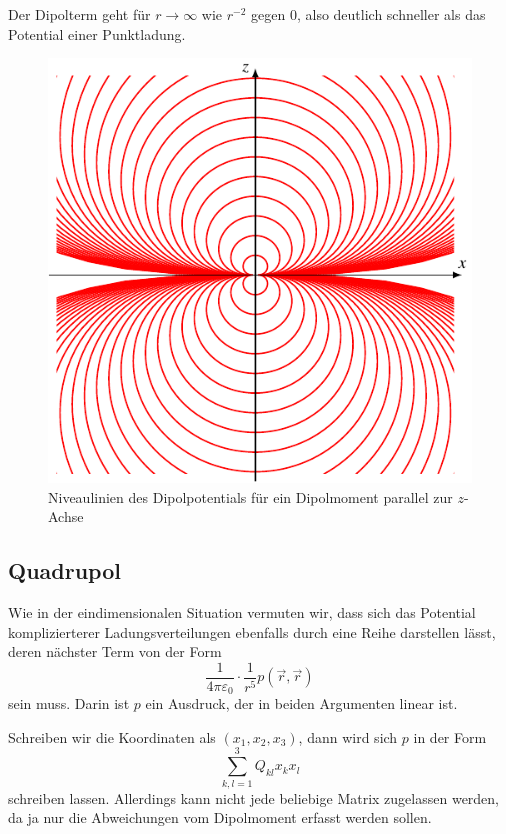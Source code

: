 Der Dipolterm geht für $r\to\infty$ wie $r^{-2}$ gegen $0$, also
deutlich schneller als das Potential einer Punktladung.

\begin{figure}
\centering
\includegraphics{chapters/tikz/dipol3.pdf}
\caption{Niveaulinien des Dipolpotentials für ein Dipolmoment
parallel zur $z$-Achse
\label{chapter:multipol:dipolniveaux}}
\end{figure}

\subsection{Quadrupol}
Wie in der eindimensionalen Situation vermuten wir, dass sich
das Potential komplizierterer Ladungsverteilungen ebenfalls durch
eine Reihe darstellen lässt, deren nächster Term von der Form
\begin{equation}
\frac1{4\pi\varepsilon_0}\cdot\frac{1}{r^5} p(\vec{r},\vec{r})
\label{skript:multipol:quadropolterm}
\end{equation}
sein muss.
Darin ist $p$ ein Ausdruck, der in beiden Argumenten linear ist.

Schreiben wir die Koordinaten als $(x_1,x_2,x_3)$, dann wird 
sich $p$ in der Form
\begin{equation}
\sum_{k,l=1}^3 Q_{kl}x_kx_l
\label{skript:multipol:qsumme}
\end{equation}
schreiben lassen.
Allerdings kann nicht jede beliebige Matrix zugelassen werden, 
da ja nur die Abweichungen vom Dipolmoment erfasst werden sollen.

